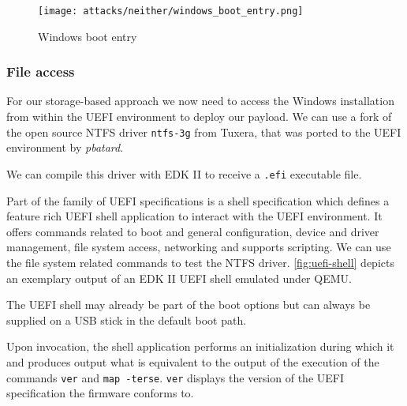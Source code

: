 \begin{figure}[htb]
    \centering
    \texttt{[image: attacks/neither/windows\_boot\_entry.png]}
    \caption{Windows boot entry }
    \label{fig:windows-boot-entry}
\end{figure}

\subsubsection{File access}

For our storage-based approach we now need to access the Windows installation from within the \ac{UEFI} environment to deploy our payload.
We can use a fork of the open source \ac{NTFS} driver \lstinline{ntfs-3g} from Tuxera\cite{ntfs-3g}, that was ported to the \ac{UEFI} environment by \emph{pbatard}\cite{ntfs-3g-uefi}.

We can compile this driver with \ac{EDK} II to receive a \lstinline{.efi} executable file.

Part of the family of \ac{UEFI} specifications is a shell specification which defines a feature rich \ac{UEFI} shell application to interact with the \ac{UEFI} environment\cite[1.1]{uefi-shell-spec}.
It offers commands related to boot and general configuration, device and driver management, file system access, networking\cite[5.1]{uefi-shell-spec} and supports scripting\cite[4]{uefi-shell-spec}.
We can use the file system related commands to test the \ac{NTFS} driver.
\autoref{fig:uefi-shell} depicts an exemplary output of an \ac{EDK} II \ac{UEFI} shell emulated under QEMU.

The \ac{UEFI} shell may already be part of the boot options but can always be supplied on a \ac{USB} stick in the default boot path.

Upon invocation, the shell application performs an initialization during which it  and produces output what is equivalent to the output of the execution of the commands \lstinline{ver} and \lstinline{map -terse}\cite[3.3 Initialization]{uefi-shell-spec}.
\lstinline{ver} displays the version of the \ac{UEFI} specification the firmware conforms to\cite[5.3 Shell Commands]{uefi-shell-spec}.


